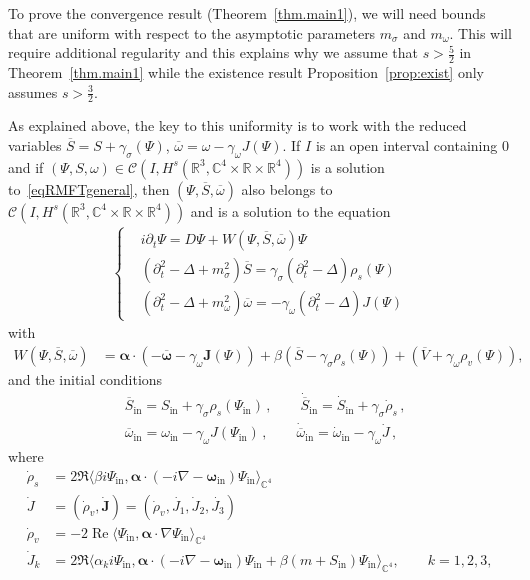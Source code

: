\documentclass[10pt]{amsart}
\theoremstyle{definition}\newtheorem{defi}[theo]{Definition}\newtheorem{rema}[theo]{Remark}\newtheorem{exam}[theo]{Example}\newtheorem{exem}[theo]{Example}\newtheorem{nota}[theo]{Notation}
\DeclareMathOperator{\re}{Re}
\newcommand{\rmin}{\mathrm{in}}
\newcommand{\cC}{\mathcal{C}}
\newcommand\R{\mathbb{R}}
\newcommand\C{\mathbb{C}}
\renewcommand\bar{\overline}
\begin{document}
To prove the convergence result (Theorem~\ref{thm.main1}), we will need bounds that are uniform with respect to the asymptotic parameters $m_\sigma$ and $m_\omega$. This will require additional regularity and this explains why we assume that $s>\tfrac52$ in Theorem~\ref{thm.main1} while the existence result Proposition~\ref{prop:exist} only assumes $s>\tfrac32$.

As explained above, the key to this uniformity is to work with the reduced variables $\overline{S}=S+\gamma_\sigma(\Psi)$, $\overline{\omega}=\omega - \gamma_\omega J(\Psi)$. If $I$ is an open interval containing $0$ and if $(\Psi,S,\omega)\in\cC(I,H^s(\R^3,\C^4\times\R\times\R^4))$ is a solution to~\eqref{eqRMFTgeneral}, then $(\Psi,\bar{S},\bar{\omega})$ also belongs to $\cC(I,H^s(\R^3,\C^4\times\R\times\R^4))$ and is a solution to the equation
\begin{align}\label{eqRMFTgeneralchanged}
\begin{cases}
&i\partial_t \Psi=D \Psi + W(\Psi,\overline{S}, \overline{\omega}) \Psi \\
&\left(\partial_t^2-\Delta + m_\sigma^2\right)\overline{S} = \gamma_\sigma\left(\partial_t^2-\Delta\right)\rho_{s}(\Psi)\\
&\left(\partial_t^2-\Delta + m_\omega^2\right)\overline{\omega} = -\gamma_\omega\left(\partial_t^2-\Delta\right)J(\Psi)
\end{cases}
\end{align}
with
\begin{align}\label{eq:W-def}
W\left(\Psi,\overline{S}, \overline{\omega}\right)&= \bm \alpha \cdot \left(- \overline{\bm \omega}-\gamma_\omega{\bm J}(\Psi)\right) +\beta \left(\overline{S}-\gamma_\sigma\rho_s(\Psi)\right) +\left(\overline{V}+ \gamma_\omega\rho_v(\Psi)\right),
\end{align}
and the initial conditions
\begin{equation}\label{eq:init-red}
\begin{split}
&\overline{S}_\rmin=S_\rmin + \gamma_\sigma\rho_{s}(\Psi_\rmin)\,,
\qquad\dot{\overline{S}}_\rmin=\dot{S}_\rmin + \gamma_\sigma\dot\rho_{s}\,,
\\
&\overline{\omega}_\rmin=\omega_\rmin- \gamma_\omega J(\Psi_\rmin)\,,
\qquad \dot{\overline{\omega}}_\rmin=\dot{\omega}_\rmin- \gamma_\omega \dot{J}\,,
\end{split}
\end{equation}
where
\begin{equation}
\begin{split}
\dot\rho_{s} &=2\Re\big\langle \beta i\Psi_\rmin,\bm \alpha \cdot (-i\nabla - \bm \omega_\rmin)\Psi_\rmin\big\rangle_{\C^4} \\
\dot{J}&=\left(\dot \rho_v, \dot {\bm J}\right)=\left(\dot \rho_v, \dot {J_1},\dot {J}_2, \dot {J_3}\right) \\
\dot \rho_v &=- 2\re \langle \Psi_\rmin, {\bm \alpha}\cdot \nabla \Psi_\rmin\rangle_{\C^4} \\
\dot {J}_k&= 2\Re\big\langle\alpha_k i\Psi_\rmin,\bm \alpha \cdot (-i\nabla - \bm \omega_\rmin)\Psi_\rmin +\beta (m+S_\rmin)\Psi_\rmin\big\rangle_{\C^4}, \qquad k=1,2,3,
\end{split}
\end{equation}
\end{document}
